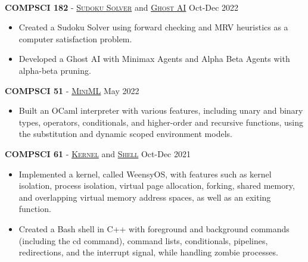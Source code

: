 \documentclass[11pt]{article}
\begin{document}
  \vspace{-7pt}\\
  \noindent\makebox[\linewidth]{\rule{7.5in}{0.3pt}}

    \noindent \textbf{COMPSCI 182} - \href{http://procaccia.info/courses/CS182-F22/pset2.pdf}{\textsc{Sudoku Solver}} and \href{http://procaccia.info/courses/CS182-F22/pset3.pdf}{\textsc{Ghost AI}} \hfill Oct-Dec 2022
    \begin{itemize}[itemsep=-.4em, leftmargin=1em]\vspace{-2mm}
      \item Created a Sudoku Solver using forward checking and MRV heuristics as a computer satisfaction problem.
      \item Developed a Ghost AI with Minimax Agents and Alpha Beta Agents with alpha-beta pruning. 
    \end{itemize}\vspace{-1mm}

    \noindent \textbf{COMPSCI 51} - \href{https://book.cs51.io/pdfs/abstraction-21-project.pdf}{\textsc{MiniML}} \hfill May 2022
    \begin{itemize}[itemsep=-.4em, leftmargin=1em]\vspace{-2mm}
      \item Built an OCaml interpreter with various features, including unary and binary types, operators, conditionals, and higher-order and recursive functions, using the substitution and dynamic scoped environment models. 
    \end{itemize}\vspace{-1mm}

    \noindent \textbf{COMPSCI 61} - 
      \href{https://cs61.seas.harvard.edu/site/2021/WeensyOS/}{\textsc{Kernel}} and 
      \href{https://cs61.seas.harvard.edu/site/2021/Shell/}{\textsc{Shell}} \hfill Oct-Dec 2021
    \begin{itemize}[itemsep=-.4em, leftmargin=1em]\vspace{-2mm}
      \item Implemented a kernel, called WeensyOS, with features such as kernel isolation, process isolation, virtual page allocation, forking, shared memory, and overlapping virtual memory address spaces, as well as an exiting function.
      \item Created a Bash shell in C++ with foreground and background commands (including the cd command), command lists, conditionals, pipelines, redirections, and the interrupt signal, while handling zombie processes.
    \end{itemize}
\end{document}
